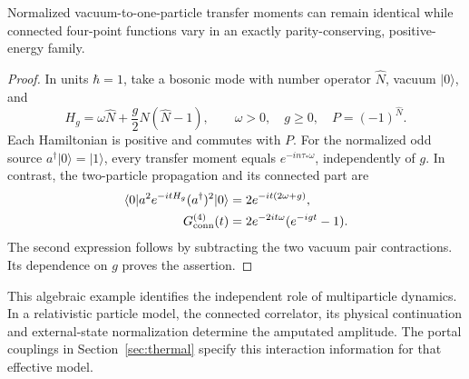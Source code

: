 \begin{proposition}\label{prop:interaction-data}
Normalized vacuum-to-one-particle transfer moments can remain identical while connected four-point functions vary in an exactly parity-conserving, positive-energy family.
\end{proposition}
\begin{proof}
In units $\hbar=1$, take a bosonic mode with number operator $\widehat N$, vacuum $|0\rangle$, and
\[
H_g=\omega\widehat N+\frac g2\widehat N(\widehat N-1),\qquad
\omega>0,\quad g\geq0,\quad P=(-1)^{\widehat N}.
\]
Each Hamiltonian is positive and commutes with $P$. For the normalized odd source $a^\dagger|0\rangle=|1\rangle$, every transfer moment equals $e^{-in\tau_*\omega}$, independently of $g$. In contrast, the two-particle propagation and its connected part are
\begin{align}
\langle0|a^2e^{-itH_g}(a^\dagger)^2|0\rangle&=2e^{-it(2\omega+g)},\\
G^{(4)}_{\rm conn}(t)&=2e^{-2it\omega}(e^{-igt}-1).
\end{align}
The second expression follows by subtracting the two vacuum pair contractions. Its dependence on $g$ proves the assertion.
\end{proof}
This algebraic example identifies the independent role of multiparticle dynamics. In a relativistic particle model, the connected correlator, its physical continuation and external-state normalization determine the amputated amplitude. The portal couplings in Section~\ref{sec:thermal} specify this interaction information for that effective model.

